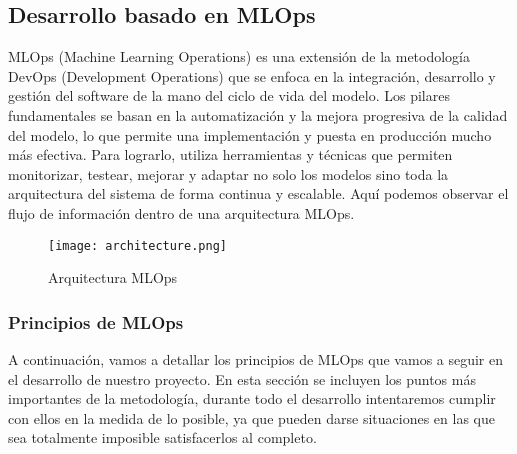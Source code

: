 \subsection{Desarrollo basado en MLOps}
MLOps (Machine Learning Operations) es una extensión de la metodología DevOps (Development Operations)
que se enfoca en la integración, desarrollo y gestión del software de la mano del ciclo de vida del modelo.
Los pilares fundamentales se basan en la automatización y la mejora progresiva de la calidad del modelo,
lo que permite una implementación y puesta en producción mucho más efectiva. Para lograrlo, utiliza herramientas
y técnicas que permiten monitorizar, testear, mejorar y adaptar no solo los modelos sino toda la arquitectura
del sistema de forma continua y escalable. Aquí podemos observar el flujo de información dentro de una
arquitectura MLOps.

\begin{figure}[ht]
    \centering
    \texttt{[image: architecture.png]}
    \caption{Arquitectura MLOps}
    \label{fig:architecure-mlops}
\end{figure}

\subsubsection{Principios de MLOps}
A continuación, vamos a detallar los principios de MLOps que vamos a seguir en el desarrollo de nuestro proyecto.
En esta sección se incluyen los puntos más importantes de la metodología, durante todo el desarrollo intentaremos
cumplir con ellos en la medida de lo posible, ya que pueden darse situaciones en las que sea totalmente imposible
satisfacerlos al completo.

